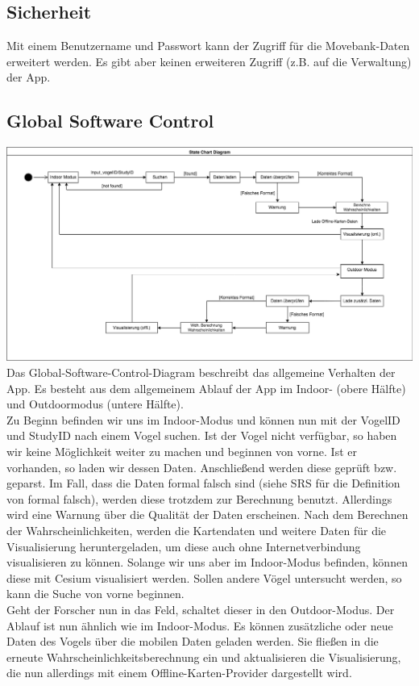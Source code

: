 \documentclass[12pt]{article} %
\begin{document}


\subsection{Sicherheit}
Mit einem Benutzername und Passwort kann der Zugriff für die Movebank-Daten erweitert werden. Es gibt aber keinen erweiteren Zugriff (z.B. auf die Verwaltung) der App. 


\subsection{Global Software Control}

\includegraphics[width = \textwidth]{Diagramme/state_diagram.png}
Das Global-Software-Control-Diagram beschreibt das allgemeine Verhalten der App. Es besteht aus dem allgemeinem Ablauf der App im Indoor- (obere Hälfte) und Outdoormodus (untere Hälfte). \\
Zu Beginn befinden wir uns im Indoor-Modus und können nun mit der VogelID und StudyID nach einem Vogel suchen. Ist der Vogel nicht verfügbar, so haben wir keine Möglichkeit weiter zu machen und beginnen von vorne. Ist er vorhanden, so laden wir dessen Daten. Anschließend werden diese geprüft bzw. geparst. Im Fall, dass die Daten formal falsch sind (siehe SRS für die Definition von formal falsch), werden diese trotzdem zur Berechnung benutzt. Allerdings wird eine Warnung über die Qualität der Daten erscheinen. Nach dem Berechnen der Wahrscheinlichkeiten, werden die Kartendaten und weitere Daten für die Visualisierung heruntergeladen, um diese auch ohne Internetverbindung visualisieren zu können. Solange wir uns aber im Indoor-Modus befinden, können diese mit Cesium visualisiert werden. Sollen andere Vögel untersucht werden, so kann die Suche von vorne beginnen. \\
Geht der Forscher nun in das Feld, schaltet dieser in den Outdoor-Modus. Der Ablauf ist nun ähnlich wie im Indoor-Modus. Es können zusätzliche oder neue Daten des Vogels über die mobilen Daten geladen werden. Sie fließen in die erneute Wahrscheinlichkeitsberechnung ein und aktualisieren die Visualisierung, die nun allerdings mit einem Offline-Karten-Provider dargestellt wird. \\
\end{document}
